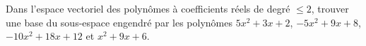 \begin{exercice}\label{exoLineraire0025}

	Dans l'espace vectoriel des polynômes à coefficients réels de degré $\leq 2$, trouver une base du sous-espace engendré par les polynômes $5x^2+3x+2$, $-5x^2+9x+8$, $-10x^2+18x+12$ et $x^2+9x+6$.

\end{exercice}
